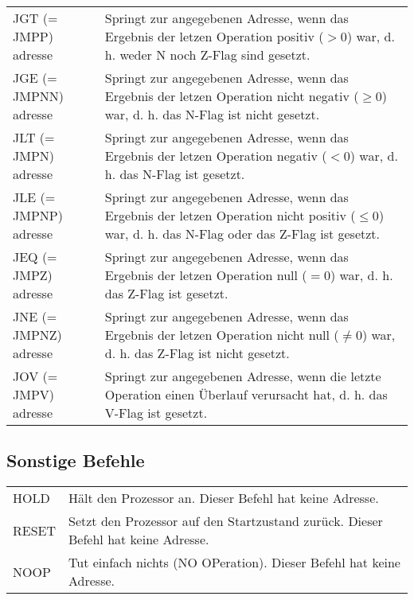 \documentclass{lehramt-informatik-haupt}
\begin{document}
\begin{tabularx}{\linewidth}{lX}
JGT (= JMPP) adresse &
Springt zur angegebenen Adresse, wenn das Ergebnis der letzen Operation
positiv ($> 0$) war, d. h. weder N noch Z-Flag sind gesetzt. \\

JGE (= JMPNN) adresse &
Springt zur angegebenen Adresse, wenn das Ergebnis der letzen Operation
nicht negativ ($\geq 0$) war, d. h. das N-Flag ist nicht gesetzt. \\

JLT (= JMPN) adresse &
Springt zur angegebenen Adresse, wenn das Ergebnis der letzen Operation
negativ ($< 0$) war, d. h. das N-Flag ist gesetzt. \\

JLE (= JMPNP) adresse &
Springt zur angegebenen Adresse, wenn das Ergebnis der letzen Operation
nicht positiv ($\leq 0$) war, d. h. das N-Flag oder das Z-Flag ist gesetzt.
\\

JEQ (= JMPZ) adresse &
Springt zur angegebenen Adresse, wenn das Ergebnis der letzen Operation
null ($= 0$) war, d. h. das Z-Flag ist gesetzt. \\

JNE (= JMPNZ) adresse &
Springt zur angegebenen Adresse, wenn das Ergebnis der letzen Operation
nicht null ($\neq 0$) war, d. h. das Z-Flag ist nicht gesetzt. \\

JOV (= JMPV) adresse &
Springt zur angegebenen Adresse, wenn die letzte Operation einen
Überlauf verursacht hat, d. h. das V-Flag ist gesetzt. \\
\end{tabularx}

%

\subsection{Sonstige Befehle}

\begin{tabularx}{\linewidth}{lX}
HOLD & Hält den Prozessor an. Dieser Befehl hat keine Adresse. \\
RESET & Setzt den Prozessor auf den Startzustand zurück. Dieser Befehl hat keine Adresse. \\
NOOP & Tut einfach nichts (NO OPeration). Dieser Befehl hat keine Adresse. \\

\end{tabularx}
\end{document}
